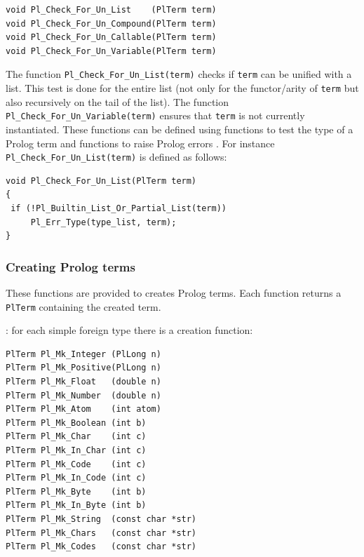 \begin{Code}
\begin{verbatim}
void Pl_Check_For_Un_List    (PlTerm term)
void Pl_Check_For_Un_Compound(PlTerm term)
void Pl_Check_For_Un_Callable(PlTerm term)
void Pl_Check_For_Un_Variable(PlTerm term)
\end{verbatim}
\end{Code}

The function \texttt{Pl\_Check\_For\_Un\_List(term)} checks if \texttt{term}
can be unified with a list. This test is done for the entire list (not only
for the functor/arity of \texttt{term} but also recursively on the tail of
the list). The function \texttt{Pl\_Check\_For\_Un\_Variable(term)} ensures
that \texttt{term} is not currently instantiated. These functions can be
defined using functions to test the type of a Prolog term
 and functions to raise Prolog errors
. For instance
\texttt{Pl\_Check\_For\_Un\_List(term)} is defined as follows:

\begin{Code}
\begin{verbatim}
void Pl_Check_For_Un_List(PlTerm term)
{
 if (!Pl_Builtin_List_Or_Partial_List(term))
     Pl_Err_Type(type_list, term);
}
\end{verbatim}
\end{Code}

\subsubsection{Creating Prolog terms}
\label{Creating-Prolog-terms}
These functions are provided to creates Prolog terms. Each function returns
a \texttt{PlTerm} containing the created term.

: for each simple foreign type
 there is a creation function:

\begin{Code}
\begin{verbatim}
PlTerm Pl_Mk_Integer (PlLong n)
PlTerm Pl_Mk_Positive(PlLong n)
PlTerm Pl_Mk_Float   (double n)
PlTerm Pl_Mk_Number  (double n)
PlTerm Pl_Mk_Atom    (int atom)
PlTerm Pl_Mk_Boolean (int b)
PlTerm Pl_Mk_Char    (int c)
PlTerm Pl_Mk_In_Char (int c)
PlTerm Pl_Mk_Code    (int c)
PlTerm Pl_Mk_In_Code (int c)
PlTerm Pl_Mk_Byte    (int b)
PlTerm Pl_Mk_In_Byte (int b)
PlTerm Pl_Mk_String  (const char *str)
PlTerm Pl_Mk_Chars   (const char *str)
PlTerm Pl_Mk_Codes   (const char *str)
\end{verbatim}
\end{Code}

